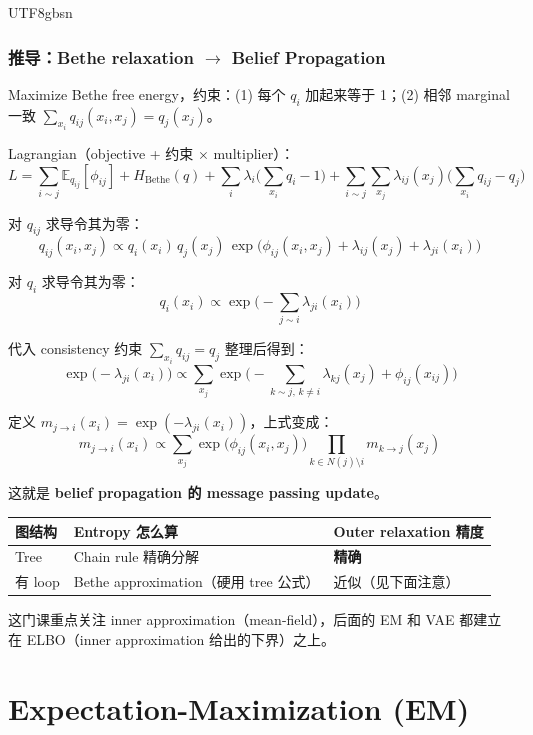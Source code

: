 \documentclass[11pt]{article}
\begin{document}
\begin{CJK}{UTF8}{gbsn}
\subsubsection{推导：Bethe relaxation $\to$ Belief Propagation}

Maximize Bethe free energy，约束：(1) 每个 $q_i$ 加起来等于 1；(2) 相邻 marginal 一致 $\sum_{x_i} q_{ij}(x_i, x_j) = q_j(x_j)$。

Lagrangian（objective + 约束 $\times$ multiplier）：
\[
  L = \sum_{i \sim j} \mathbb{E}_{q_{ij}}[\phi_{ij}] + H_{\text{Bethe}}(q) + \sum_i \lambda_i\Big(\sum_{x_i} q_i - 1\Big) + \sum_{i \sim j}\sum_{x_j} \lambda_{ij}(x_j)\Big(\sum_{x_i} q_{ij} - q_j\Big)
\]

对 $q_{ij}$ 求导令其为零：
\[
  q_{ij}(x_i, x_j) \propto q_i(x_i)\, q_j(x_j)\, \exp\!\big(\phi_{ij}(x_i, x_j) + \lambda_{ij}(x_j) + \lambda_{ji}(x_i)\big)
\]

对 $q_i$ 求导令其为零：
\[
  q_i(x_i) \propto \exp\!\Big(-\sum_{j \sim i} \lambda_{ji}(x_i)\Big)
\]

代入 consistency 约束 $\sum_{x_i} q_{ij} = q_j$ 整理后得到：
\[
  \exp\!\big(-\lambda_{ji}(x_i)\big) \propto \sum_{x_j} \exp\!\Big(-\sum_{k \sim j,\, k \neq i} \lambda_{kj}(x_j) + \phi_{ij}(x_{ij})\Big)
\]

定义 $m_{j \to i}(x_i) = \exp(-\lambda_{ji}(x_i))$，上式变成：
\[
  \boxed{m_{j \to i}(x_i) \propto \sum_{x_j} \exp\!\big(\phi_{ij}(x_i, x_j)\big) \prod_{k \in N(j) \setminus i} m_{k \to j}(x_j)}
\]

这就是 \textbf{belief propagation 的 message passing update}。

\begin{center}
\begin{tabular}{l|l|l}
  图结构 & Entropy 怎么算 & Outer relaxation 精度 \\
  \hline
  Tree & Chain rule 精确分解 & \textbf{精确} \\
  有 loop & Bethe approximation（硬用 tree 公式） & 近似（见下面注意） \\
\end{tabular}
\end{center}

\vspace{0.5em}
这门课重点关注 inner approximation（mean-field），后面的 EM 和 VAE 都建立在 ELBO（inner approximation 给出的下界）之上。


\section{Expectation-Maximization (EM)}


\end{CJK}
\end{document}
